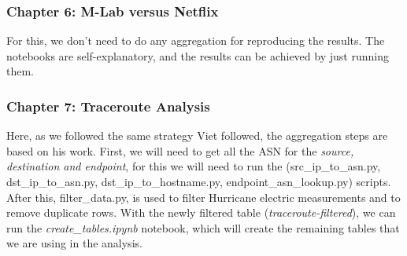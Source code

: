 \subsubsection*{Chapter 6: M-Lab versus Netflix}
For this, we don't need to do any aggregation for reproducing the results. The notebooks are self-explanatory, and the results can be achieved by just running them.

\subsubsection*{Chapter 7: Traceroute Analysis}
Here, as we followed the same strategy Viet \cite{viet} followed, the aggregation steps are based on his work. First, we will need to get all the ASN for the \textit{source, destination and endpoint}, for this we will need to run the
(src\_ip\_to\_asn.py, dst\_ip\_to\_asn.py, dst\_ip\_to\_hostname.py, endpoint\_asn\_lookup.py) scripts. After this, filter\_data.py, is used to filter Hurricane electric measurements and to remove duplicate rows.
With the newly filtered table (\textit{traceroute-filtered}), we can run the \textit{create\_tables.ipynb} notebook, which will create the remaining tables that we are using in the analysis. 